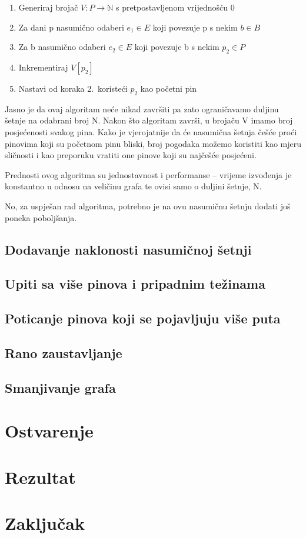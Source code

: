 \documentclass[times, utf8, seminar]{fer}
\begin{document}
\begin{enumerate}
	\item Generiraj brojač $V: P \to \mathbb{N}$ s pretpostavljenom vrijednošću 0
	\item Za dani p nasumično odaberi $e_1 \in E$ koji povezuje p s nekim $b \in B$
	\item Za b nasumično odaberi $e_2 \in E$ koji povezuje b s nekim $p_2 \in P$
	\item Inkrementiraj $V[p_2]$
	\item Nastavi od koraka 2.\ koristeći $p_2$ kao početni pin
\end{enumerate}

Jasno je da ovaj algoritam neće nikad završiti pa zato ograničavamo duljinu šetnje na odabrani broj N. Nakon što algoritam završi, u brojaču V imamo broj posjećenosti svakog pina. Kako je vjerojatnije da će nasumična šetnja češće proći pinovima koji su početnom pinu bliski, broj pogodaka možemo koristiti kao mjeru sličnosti i kao preporuku vratiti one pinove koji su najčešće posjećeni.

Prednosti ovog algoritma su jednostavnost i performanse -- vrijeme izvođenja je konstantno u odnosu na veličinu grafa te ovisi samo o duljini šetnje, N.

No, za uspješan rad algoritma, potrebno je na ovu nasumičnu šetnju dodati još poneka poboljšanja.

\section{Dodavanje naklonosti nasumičnoj šetnji}

\section{Upiti sa više pinova i pripadnim težinama}

\section{Poticanje pinova koji se pojavljuju više puta}

\section{Rano zaustavljanje}

\section{Smanjivanje grafa}

\chapter{Ostvarenje}

\chapter{Rezultat}

\chapter{Zaključak}



\end{document}
